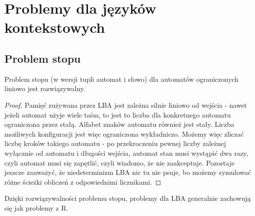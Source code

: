 \section{Problemy dla języków kontekstowych}

\subsection{Problem stopu}

\begin{lemma}
    Problem stopu (w wersji tupli automat i słowo) dla automatów ograniczonych liniowo jest rozwiązywalny.
\end{lemma}

\begin{proof}
    Pamięć zużywana przez LBA jest zależna silnie liniowo od wejścia - nawet jeżeli automat użyje wiele taśm, to jest to liczba dla konkretnego automatu ograniczona przez stałą.
    Alfabet znaków automatu również jest stały. Liczba możliwych konfiguracji jest więc ograniczona wykładniczo. Możemy więc zliczać liczbę kroków takiego automatu - po
    przekroczeniu pewnej liczby zależnej wyłącznie od automatu i długości wejścia, automat stan musi wystąpić dwa razy, czyli automat musi się zapętlić, czyli wiadomo, że nie zaakceptuje.
    Pozostaje jeszcze zauważyć, że niedeterminizm LBA nic tu nie psuje, bo możemy symulować różne ścieżki obliczeń z odpowiednimi licznikami.
\end{proof}

Dzięki rozwiązywalności problemu stopu, problemy dla LBA generalnie zachowują się jak problemy z R.